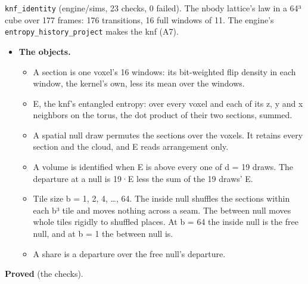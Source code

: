 \texttt{knf\_\allowbreak{}identity} (engine/sims, 23 checks, 0 failed). The nbody lattice's law in a 64³ cube over 177 frames: 176 transitions, 16 full windows of 11. The engine's \texttt{entropy\_\allowbreak{}history\_\allowbreak{}project} makes the knf (A7).

\begin{itemize}
\item \textbf{The objects.}

\begin{itemize}
\item A section is one voxel's 16 windows: its bit-weighted flip density in each window, the kernel's own, less its mean over the windows.
\item E, the knf's entangled entropy: over every voxel and each of its z, y and x neighbors on the torus, the dot product of their two sections, summed.
\item A spatial null draw permutes the sections over the voxels. It retains every section and the cloud, and E reads arrangement only.
\item A volume is identified when E is above every one of d = 19 draws. The departure at a null is 19·E less the sum of the 19 draws' E.
\item Tile size b = 1, 2, 4, …, 64. The inside null shuffles the sections within each b³ tile and moves nothing across a seam. The between null moves whole tiles rigidly to shuffled places. At b = 64 the inside null is the free null, and at b = 1 the between null is.
\item A share is a departure over the free null's departure.
\end{itemize}
\end{itemize}

\textbf{Proved} (the checks).

